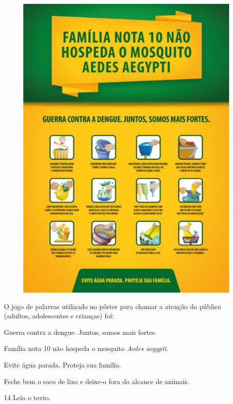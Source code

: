 \begin{figure}[htpb!]
\centering
\includegraphics[width=.6\textwidth]{./media/simulados/image2.jpeg}
\end{figure}


O jogo de palavras utilizado no pôster para chamar a atenção do público
(adultos, adolescentes e crianças) foi:

\begin{escolha}
\item Guerra contra a dengue. Juntos, somos mais fortes.

\item Família nota 10 não hospeda o mosquito \emph{Aedes aegypti}.

\item Evite água parada. Proteja sua família.

\item Feche bem o saco de lixo e deixe-o fora do alcance de animais.
\end{escolha}

\pagebreak
\num{14} Leia o texto.


